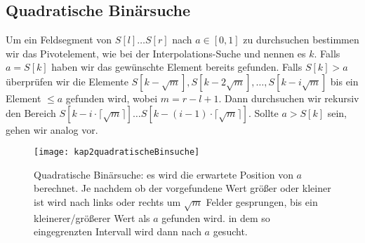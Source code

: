 \subsection{Quadratische Binärsuche}
Um ein Feldsegment von $S[l]\ldots S[r]$ nach $a \in [0,1]$ zu durchsuchen bestimmen wir das Pivotelement, wie bei der Interpolations-Suche und nennen es $k$. Falls $a=S[k]$ haben wir das gewünschte Element bereits gefunden. Falls $S[k] > a$ überprüfen wir die Elemente $S[k-\sqrt{m}], S[k-2 \sqrt{m}], \ldots , S[k - i \sqrt{m}]$ bis ein Element $\le a$ gefunden wird, wobei $m = r-l+1$. Dann durchsuchen wir rekursiv den Bereich $S[k-i \cdot \lceil\sqrt{m}\rceil] \ldots S[k-(i-1) \cdot \lceil\sqrt{m}\rceil]$. Sollte $a > S[k]$ sein, gehen wir analog vor.

\begin{figure}[hbt]
  \centering
  \texttt{[image: kap2quadratischeBinsuche]}
  \caption{Quadratische Binärsuche: es wird die erwartete Position von $a$ berechnet. Je nachdem ob der vorgefundene Wert größer oder kleiner ist wird nach links oder rechts um $\sqrt{m}$ Felder gesprungen, bis ein kleinerer/größerer Wert als $a$ gefunden wird. in dem so eingegrenzten Intervall wird dann nach $a$ gesucht.}
  \label{quadratischeBinsuche}
\end{figure}


